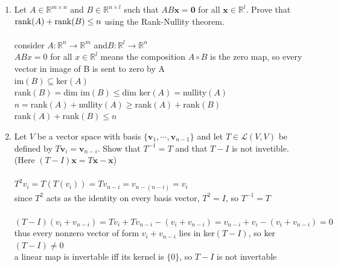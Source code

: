 \documentclass{article}
\begin{document}
{{\begin{enumerate}
\newpage\item Let $A\in\mathbb{R}^{m\times n}$ and $B\in\mathbb{R}^{n\times l}$ such that $AB{\bm x}=\textbf{0}$ for all ${\bm x}\in \mathbb{R}^l$. Prove that ${\rm rank}(A)+{\rm rank}(B)\leq n$ using the Rank-Nullity theorem.
\\
\\consider $A:\mathbb{R}^n\rightarrow \mathbb{R}^m$ and$B:\mathbb{R}^l\rightarrow\mathbb{R}^n$
\\$ABx=0$ for all $x\in\mathbb{R}^l$ means the composition $A\circ B$ is the zero map, so every vector in image of B is sent to zero by A
\\im$(B)\subseteq$ker$(A)$
\\rank$(B)=$dim im$(B) \leq$dim ker$(A)=$nullity$(A)$
\\$n=$rank$(A)+$nullity$(A)\geq$rank$(A)+$rank$(B)$
\\rank$(A)+$rank$(B)\leq n$


\newpage\item Let $V$ be a vector space with basis $\{{\bm v}_1,\cdots,{\bm v}_{n-1}\}$ and let $T\in\mathcal{L}(V,V)$ be defined by $T{\bm v}_i={\bm v}_{n-i}$. Show that $T^{-1}=T$ and that $T-I$ is not invetible. (Here $(T-I){\bm x}=T{\bm x}-{\bm x}$)
\\
\\$T^2v_i=T(T(v_i))=Tv_{n-i}=v_{n-(n-i)}=v_i$
\\since $T^2$ acts as the identity on every basis vector, $T^2=I$, so $T^{-1}=T$
\\
\\$(T-I)(v_i+v_{n-i})=Tv_i+Tv_{n-i}-(v_i+v_{n-i})=v_{n-i}+v_i-(v_i+v_{n-i})=0$
\\thus every nonzero  vector of form $v_i+v_{n-i}$ lies in ker$(T-I)$, so ker$(T-I)\neq0$
\\a linear map is invertable iff its kernel is $\{0\}$, so $T-I$ is not invertable


\end{enumerate}}}
\end{document}
